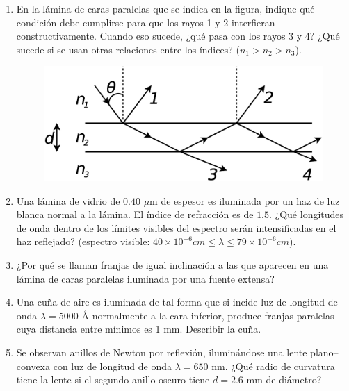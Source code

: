 \documentclass[11pt,spanish]{article}
\begin{document}
\begin{enumerate}
    
    \item En la lámina de caras paralelas que se indica en la figura, indique
    qué condición debe cumplirse para que los rayos 1 y 2 interfieran
    constructivamente. Cuando eso sucede, ¿qué pasa con los rayos 3 y
    4? ¿Qué sucede si se usan otras relaciones entre los índices?
    ($n_{1}>n_{2}>n_{3}$).

    \begin{figure}[H]
        \centering{}
        \includegraphics[clip,scale=0.3]{figs/ej5-21}
    \end{figure}


    \item Una lámina de vidrio de $0.40$ $\mu$m de espesor es iluminada por
    un haz de luz blanca normal a la lámina. El índice de refracción es
    de $1.5$. ¿Qué longitudes de onda dentro de los límites visibles
    del espectro serán intensificadas en el haz reflejado? (espectro visible:
    $40\times10^{-6}\unit{cm}\le\lambda\le79\times10^{-6}\unit{cm}$). 


    \item ¿Por qué se llaman franjas de igual inclinación a las que aparecen
    en una lámina de caras paralelas iluminada por una fuente extensa?


    \item Una cuña de aire es iluminada de tal forma que si incide luz de longitud
    de onda $\lambda=$5000 Å normalmente a la cara inferior, produce
    franjas paralelas cuya distancia entre mínimos es 1 mm. Describir
    la cuña. 
    

    \item Se observan anillos de Newton por reflexión, iluminándose una lente
    plano--convexa con luz de longitud de onda $\lambda=650$ nm. ¿Qué
    radio de curvatura tiene la lente si el segundo anillo oscuro tiene
    $d=2.6$ mm de diámetro? 
    

\end{enumerate}
\end{document}
